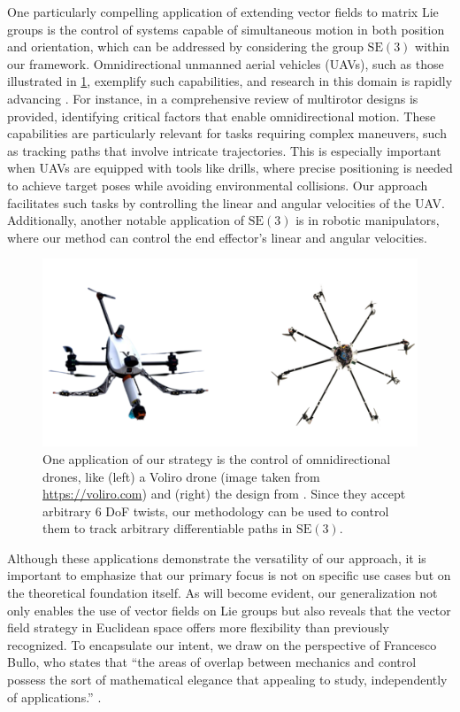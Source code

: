 One particularly compelling application of extending vector fields to matrix Lie groups is the control of systems capable of simultaneous motion in both position and orientation, which can be addressed by considering the group $\text{SE}(3)$ within our framework. Omnidirectional unmanned aerial vehicles (UAVs), such as those illustrated in \cref{fig:omnidirectionaldrone}, exemplify such capabilities, and research in this domain is rapidly advancing \citep{kamel2018voliro,Aboudorra2023,HamandiOmni}. For instance, in \citet{hamandi2021design} a comprehensive review of multirotor designs is provided, identifying critical factors that enable omnidirectional motion. These capabilities are particularly relevant for tasks requiring complex maneuvers, such as tracking paths that involve intricate trajectories. This is especially important when UAVs are equipped with tools like drills, where precise positioning is needed to achieve target poses while avoiding environmental collisions. Our approach facilitates such tasks by controlling the linear and angular velocities of the UAV. Additionally, another notable application of $\text{SE}(3)$ is in robotic manipulators, where our method can control the end effector's linear and angular velocities.
\begin{figure}[ht]
    \centering
    \includegraphics[width=.8\columnwidth]{figures/example_omnidirecitonal_wobg.png}
    \caption{One application of our strategy is the control of omnidirectional drones, like (left) a Voliro drone (image taken from \url{https://voliro.com}) and (right) the design from \citet{HamandiOmni}. Since they accept arbitrary $6$ DoF twists, our methodology can be used to control them to track arbitrary differentiable paths in $\text{SE}(3)$.}
    \label{fig:omnidirectionaldrone}
\end{figure}

Although these applications demonstrate the versatility of our approach, it is important to emphasize that our primary focus is not on specific use cases but on the theoretical foundation itself. As will become evident, our generalization not only enables the use of vector fields on Lie groups but also reveals that the vector field strategy in Euclidean space offers more flexibility than previously recognized. To encapsulate our intent, we draw on the perspective of Francesco Bullo, who states that ``the areas of overlap between mechanics and control possess the sort of mathematical elegance that  appealing to study, independently of applications.'' \citep{Bullo2004}.

